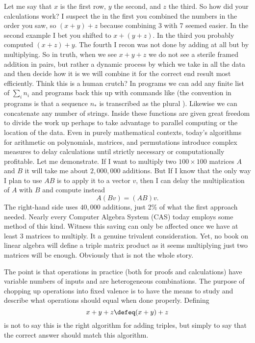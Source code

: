 Let me say that $x$ is the first row, 
$y$ the second, and $z$ the third.  So how did your calculations 
work?  I suspect the in the first you combined the numbers in the 
order you saw, so $(x+y)+z$ because combining 3 with 7 seemed easier.
In the second example I bet you shifted to $x+(y+z)$.  In the third 
you probably computed $(x+z)+y$.  The fourth I recon was not done by 
adding at all but by multiplying.  So in truth, when we see $x+y+z$ 
we do not see a sterile framed addition in pairs, but rather a dynamic process
by which we take in all the data and then decide how it is we will combine it
for the correct end result most efficiently.   Think this is a human crutch?
In programs we can add any finite list of $\sum_{i} n_i$ and 
programs back this up with commands like  
(the convention in programs is that a sequence $n_*$ is transcribed as 
the plural ).  Likewise we can concatenate any 
number of strings.  Inside these functions are given great freedom 
to divide the work up perhaps to take advantage to parallel computing 
or the location of the data.  Even in purely mathematical contexts,
today's algorithms for arithmetic on polynomials, matrices, and 
permutations introduce complex measures to delay calculations until strictly 
necessary or computationally profitable.  Let me demonstrate. 
If I want to multiply two $100\times 100$ matrices $A$ and $B$ it 
will take me about $2,000,000$ additions. But If I know that 
the only way I plan to use $AB$ is to apply it to a vector $v$,
then I can delay the multiplication of $A$ with $B$ and compute instead
\[
    A(Bv) = (AB)v.
\]
The right-hand side uses $40,000$ additions, just 2\% of what the 
first approach needed.  Nearly every Computer Algebra System (CAS) today 
employs some method of this kind.  
Witness this saving can only be affected once we have at least 3 matrices
to multiply.  It a genuine trivalent consideration.  Yet, no book
on linear algebra will define a triple matrix product as it seems 
multiplying just two matrices will be enough.  Obviously that is not the whole story.



The point is that operations in practice (both for proofs and calculations)
have variable numbers of inputs and are heterogeneous combinations.  
The purpose of chopping up operations into fixed valence is to have the means 
to study and describe what operations should equal when done properly. 
Defining 
\[ 
    x+y+z \defeq (x+y)+z
\] 
is not to say this is the right algorithm for adding triples, but simply to 
say that the correct answer should match this algorithm.



